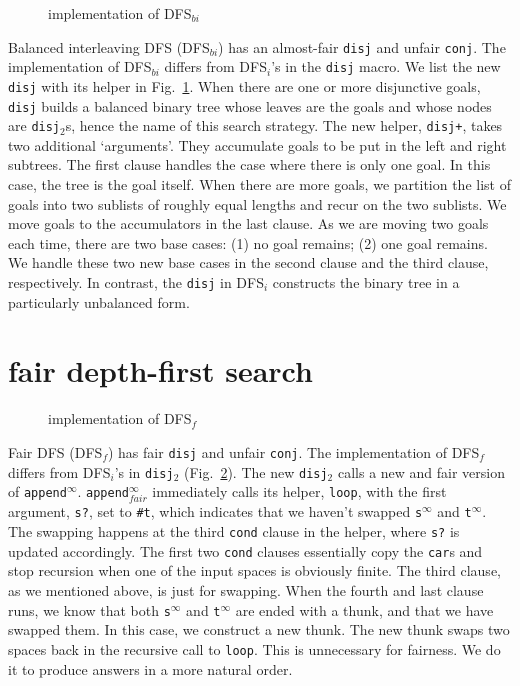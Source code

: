 \documentclass[format=acmlarge, review=true, authordraft=true]{acmart}
\newcommand{\conj}{\texttt{conj}}
\newcommand{\disj}{\texttt{disj}}
\newcommand{\disjtwo}{\texttt{disj$_2$}}
\newcommand{\DFSi }[0]{DFS$_{i}$}
\newcommand{\DFSf }[0]{DFS$_{f}$}
\newcommand{\DFSbi}[0]{DFS$_{bi}$}
\begin{document}
\begin{figure}
	
	\caption{implementation of \DFSbi{}}
	\label{balanced-disj}
\end{figure}

Balanced interleaving DFS (\DFSbi{}) has an almost-fair \disj{} and unfair 
\conj{}. The implementation of \DFSbi{} differs from 
\DFSi{}'s in the \disj{} macro. We list the new \disj{} with its 
helper in Fig.~\ref{balanced-disj}. When there are one or more disjunctive 
goals, \disj{} builds a balanced binary tree whose leaves are the goals and 
whose nodes are \disjtwo{}s, hence the name of this search strategy. 
The new helper, \texttt{disj+}, takes two additional `arguments'. They 
accumulate goals to be put in the left and right subtrees. The first clause 
handles the case where there is only one goal. In this case, the tree is the 
goal itself. When there are more goals, we partition the list of goals 
into two sublists of roughly equal lengths and recur on the two sublists. We 
move goals to the accumulators in the last clause. As we are moving 
two goals each time, there are two base cases: (1) no goal remains; (2) one 
goal remains. We handle these two new base cases in the second clause and the 
third clause, respectively. In contrast, the \disj{} in \DFSi{} constructs the 
binary tree in a particularly unbalanced form.

\section{fair depth-first search}

\begin{figure}
	
	\caption{implementation of \DFSf{}}
	\label{fDFS}
\end{figure}

Fair DFS (\DFSf) has fair \disj{} and unfair \conj{}. The 
implementation of \DFSf{} differs from \DFSi{}'s in 
\disjtwo{} (Fig.~\ref{fDFS}). The new \disjtwo{} calls a new and 
fair version of \texttt{append$^\infty$}. \texttt{append$^\infty_{fair}$} 
immediately 
calls 
its helper, \texttt{loop}, with the first argument, \texttt{s?}, set to 
\texttt{\#{}t}, which indicates that we haven't swapped
\texttt{s$^\infty$} and \texttt{t$^\infty$}. The swapping 
happens at 
the third \texttt{cond} clause in the helper, where \texttt{s?} is updated 
accordingly. The first two \texttt{cond} clauses essentially copy the 
\texttt{car}s and stop recursion when one of the input spaces is obviously 
finite. The third clause, as we mentioned above, is just for swapping. When the 
fourth and last clause runs, we know that both \texttt{s$^\infty$} and 
\texttt{t$^\infty$} are ended with a thunk, and that we have swapped them. In 
this case, we construct a new thunk. The new thunk swaps two spaces back in the
recursive call to \texttt{loop}. This is unnecessary for fairness. We do it to 
produce answers in a more natural order.
\end{document}
